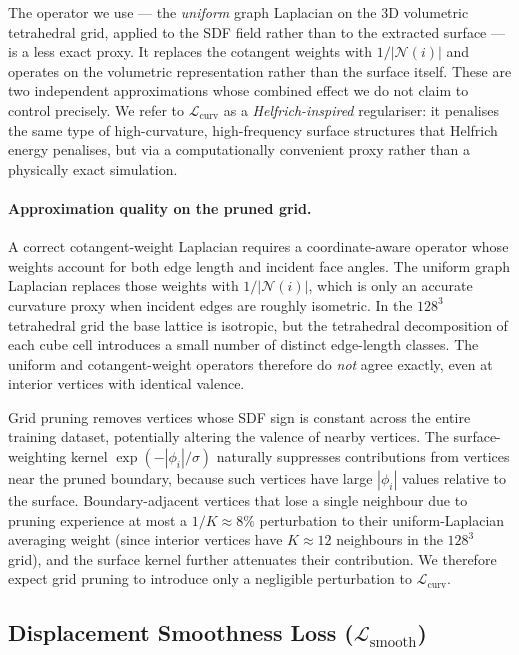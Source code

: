 \documentclass[10pt, a4paper, twocolumn]{article}
\begin{document}
The operator we use — the \emph{uniform} graph Laplacian on the 3D volumetric tetrahedral grid, applied to the SDF field rather than to the extracted surface — is a less exact proxy. It replaces the cotangent weights with $1/|\mathcal{N}(i)|$ and operates on the volumetric representation rather than the surface itself. These are two independent approximations whose combined effect we do not claim to control precisely. We refer to $\mathcal{L}_{\text{curv}}$ as a \emph{Helfrich-inspired} regulariser: it penalises the same type of high-curvature, high-frequency surface structures that Helfrich energy penalises, but via a computationally convenient proxy rather than a physically exact simulation.

\paragraph{Approximation quality on the pruned grid.}
A correct cotangent-weight Laplacian requires a coordinate-aware operator whose weights account for both edge length and incident face angles. The uniform graph Laplacian replaces those weights with $1/|\mathcal{N}(i)|$, which is only an accurate curvature proxy when incident edges are roughly isometric. In the $128^3$ tetrahedral grid the base lattice is isotropic, but the tetrahedral decomposition of each cube cell introduces a small number of distinct edge-length classes. The uniform and cotangent-weight operators therefore do \emph{not} agree exactly, even at interior vertices with identical valence.

Grid pruning removes vertices whose SDF sign is constant across the entire training dataset, potentially altering the valence of nearby vertices. The surface-weighting kernel $\exp(-|\phi_i|/\sigma)$ naturally suppresses contributions from vertices near the pruned boundary, because such vertices have large $|\phi_i|$ values relative to the surface. Boundary-adjacent vertices that lose a single neighbour due to pruning experience at most a $1/K \approx 8\%$ perturbation to their uniform-Laplacian averaging weight (since interior vertices have $K \approx 12$ neighbours in the $128^3$ grid), and the surface kernel further attenuates their contribution. We therefore expect grid pruning to introduce only a negligible perturbation to $\mathcal{L}_{\text{curv}}$.

\subsection{Displacement Smoothness Loss ($\mathcal{L}_{\text{smooth}}$)}
\end{document}
